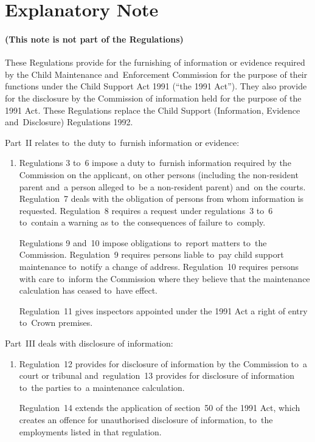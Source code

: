 \documentclass[12pt,a4paper]{article}
\begin{document}
\part{Explanatory Note}

\renewcommand\parthead{— Explanatory Note}

\subsection*{(This note is not part of the Regulations)}

These Regulations provide for the furnishing of information or evidence required by the Child Maintenance and~Enforcement Commission for the purpose of their functions under the Child Support Act 1991 (“the 1991 Act”). They also provide for the disclosure by the Commission of information held for the purpose of the 1991 Act. These Regulations replace the Child Support (Information, Evidence and~Disclosure) Regulations 1992.

Part~II relates to~the duty to~furnish information or evidence:
\begin{enumerate}\item[]
Regulations 3 to~6 impose a duty to~furnish information required by the Commission on the applicant, on other persons (including the non-resident parent and~a person alleged to~be a non-resident parent) and~on the courts. Regulation~7 deals with the obligation of persons from whom information is requested. Regulation~8 requires a request under regulations~3 to~6 to~contain a warning as to~the consequences of failure to~comply.

Regulations 9 and~10 impose obligations to~report matters to~the Commission. Regulation~9 requires persons liable to~pay child support maintenance to~notify a change of address. Regulation~10 requires persons with care to~inform the Commission where they believe that the maintenance calculation has ceased to~have effect.

Regulation~11 gives inspectors appointed under the 1991 Act a right of entry to~Crown premises.
\end{enumerate}

Part~III deals with disclosure of information:
\begin{enumerate}\item[]
Regulation~12 provides for disclosure of information by the Commission to~a court or tribunal and~regulation~13 provides for disclosure of information to~the parties to~a maintenance calculation.

Regulation~14 extends the application of section~50 of the 1991 Act, which creates an offence for unauthorised disclosure of information, to~the employments listed in that regulation.
\end{enumerate}
\end{document}
